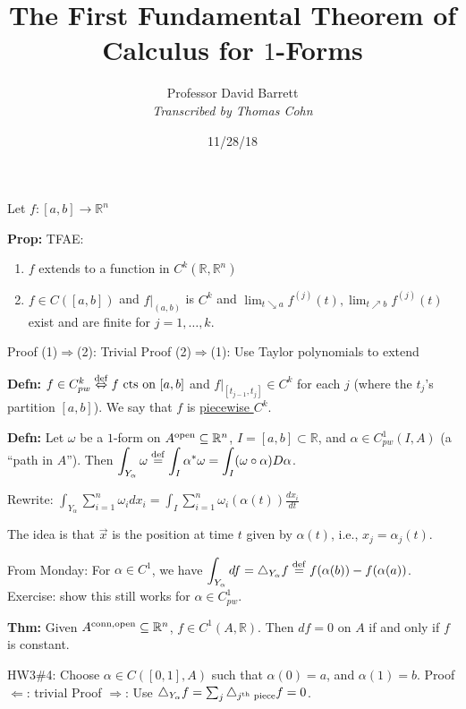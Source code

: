 \documentclass[10pt,letterpaper]{article}
\author{Professor David Barrett\\ \small\textit{Transcribed by Thomas Cohn}}
\title{The First Fundamental Theorem of Calculus for $1$-Forms}
\date{11/28/18} %
\newcommand{\n}{\hfill\break}
\newcommand{\defn}[1]{\par\noindent\settowidth{\hangindent}{\textbf{Defn: }}\textbf{Defn: }#1\n}
\newcommand{\thm}[1]{\par\noindent\settowidth{\hangindent}{\textbf{Thm: }}\textbf{Thm: }#1\n}
\newcommand{\prop}[1]{\par\noindent\settowidth{\hangindent}{\textbf{Prop: }}\textbf{Prop: }#1\n}
\newcommand{\ptxt}[1]{\textrm{\textnormal{#1}}}
\newcommand{\reals}{\mathbb{R}}
\newcommand{\R}{\reals}
\newcommand{\of}{\circ}
\begin{document}
\maketitle
\setlength\RaggedRightParindent{\parindent}
\RaggedRight

\par\noindent Let $f:[a,b]\to\R^{n}$\n

\prop{TFAE:
\begin{enumerate}[label=(\arabic*)]
	\item $f$ extends to a function in $C^{k}(\R,\R^{n})$
	\item $f\in{}C([a,b])$ and $f|_{(a,b)}$ is $C^{k}$ and $\lim_{t\searrow{}a}f^{(j)}(t),\lim_{t\nearrow{}b}f^{(j)}(t)$ exist and are finite for $j=1,\ldots,k$.
\end{enumerate}}

\par\noindent Proof (1)$\Rightarrow$(2): Trivial\n
Proof (2)$\Rightarrow$(1): Use Taylor polynomials to extend\n

\defn{$f\in{}C_{pw}^{k}\overset{\ptxt{def}}{\Leftrightarrow}f\ptxt{ cts on }[a,b]$ and $f|_{[t_{j-1},t_{j}]}\in{}C^{k}$ for each $j$ (where the $t_{j}$'s partition $[a,b]$). We say that $f$ is \underline{piecewise $C^{k}$}.}

\defn{Let $\omega$ be a $1$-form on $A^{\ptxt{open}}\subseteq\R^{n}$, $I=[a,b]\subset\R$, and $\alpha\in{}C_{pw}^{1}(I,A)$ (a ``path in $A$'').\n
Then $\displaystyle\int_{Y_{\alpha}}\omega\overset{\ptxt{def}}{=}\int_{I}\alpha^{*}\omega=\int_{I}(\omega\of\alpha)D\alpha$.}

\par\noindent Rewrite: $\displaystyle\int_{Y_{\alpha}}\sum_{i=1}^{n}\omega_{i}dx_{i}=\int_{I}\sum_{i=1}^{n}\omega_{i}(\alpha(t))\frac{dx_{i}}{dt}$\n

\par\noindent The idea is that $\vec{x}$ is the position at time $t$ given by $\alpha(t)$, i.e., $x_{j}=\alpha_{j}(t)$.\n

\par\noindent From Monday: For $\alpha\in{}C^{1}$, we have $\displaystyle\int_{Y_{\alpha}}df=\bigtriangleup_{Y_{\alpha}}f\overset{\ptxt{def}}{=}f(\alpha(b))-f(\alpha(a))$.\n
Exercise: show this still works for $\alpha\in{}C_{pw}^{1}$.\n

\thm{Given $A^{\ptxt{conn},\ptxt{open}}\subseteq\R^{n}$, $f\in{}C^{1}(A,\R)$. Then $df=0$ on $A$ if and only if $f$ is constant.}

\par\noindent HW3\#4: Choose $\alpha\in{}C([0,1],A)$ such that $\alpha(0)=a$, and $\alpha(1)=b$.\n
Proof $\Leftarrow$: trivial\n
Proof $\Rightarrow$: Use $\bigtriangleup_{Y_{\alpha}}f=\sum_{j}\bigtriangleup_{j^{\ptxt{th}}\ptxt{ piece}}f=0$.\n
\end{document}
